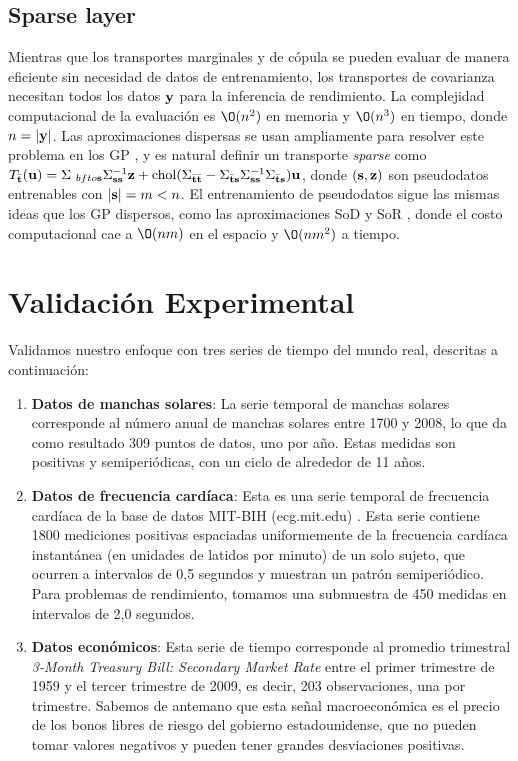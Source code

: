 \subsection{Sparse layer}
Mientras que los transportes marginales y de cópula se pueden evaluar de manera eficiente sin necesidad de datos de entrenamiento, los transportes de covarianza necesitan todos los datos \(\mathbf{y}\) para la inferencia de rendimiento. La complejidad computacional de la evaluación es \(\O(n^2)\) en memoria y \(\O(n^3)\) en tiempo, donde \(n=|\mathbf{y}|\). Las aproximaciones dispersas se usan ampliamente para resolver este problema en los GP \cite{quinonero2005unifying, snelson2006sparse, titsias2009variational}, y es natural definir un transporte \emph{sparse} como \(T_{\bfto}(\bfu) = \Sigma_{\ bfto\bfs}\Sigma_{\bfs\bfs}^{-1}\bfz + \chol(\Sigma_{\bfto\bfto} - \Sigma_{\bfto\bfs}\Sigma_{\bfs\bfs}^{ -1}\Sigma_{\bfto\bfs})\bfu\), donde \((\mathbf{s},\mathbf{z})\) son pseudodatos entrenables con \(|\mathbf{s}| = m < n\). El entrenamiento de pseudodatos sigue las mismas ideas que los GP dispersos, como las aproximaciones SoD y SoR \cite{quinonero2005unifying}, donde el costo computacional cae a \(\O(nm)\) en el espacio y \(\O(nm^2)\) a tiempo.


\section{Validación Experimental}
\label{sec:experimentstgp}


Validamos nuestro enfoque con tres series de tiempo del mundo real, descritas a continuación:
\begin{enumerate}
	\item \textbf{Datos de manchas solares}: La serie temporal de manchas solares \cite{sunspots} corresponde al número anual de manchas solares entre 1700 y 2008, lo que da como resultado 309 puntos de datos, uno por año. Estas medidas son positivas y semiperiódicas, con un ciclo de alrededor de 11 años.
	\item \textbf{Datos de frecuencia cardíaca}: Esta es una serie temporal de frecuencia cardíaca de la base de datos MIT-BIH (ecg.mit.edu) \cite{glass2012theory}. Esta serie contiene 1800 mediciones positivas espaciadas uniformemente de la frecuencia cardíaca instantánea (en unidades de latidos por minuto) de un solo sujeto, que ocurren a intervalos de 0,5 segundos y muestran un patrón semiperiódico. Para problemas de rendimiento, tomamos una submuestra de 450 medidas en intervalos de 2,0 segundos.
	\item \textbf{Datos económicos}: Esta serie de tiempo corresponde al promedio trimestral \emph{3-Month Treasury Bill: Secondary Market Rate} \cite{tb3ms} entre el primer trimestre de 1959 y el tercer trimestre de 2009, es decir, 203 observaciones, una por trimestre. Sabemos de antemano que esta señal macroeconómica es el precio de los bonos libres de riesgo del gobierno estadounidense, que no pueden tomar valores negativos y pueden tener grandes desviaciones positivas.
\end{enumerate}

